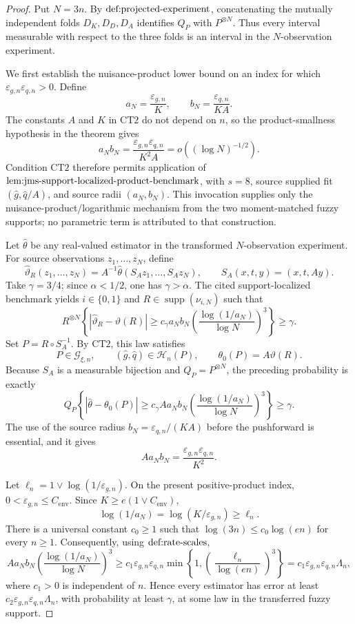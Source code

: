 \documentclass{article}
\begin{document}
\begin{proof}
Put \(N=3n\).  By \(\textup{def:projected-experiment}\), concatenating the mutually independent folds \(D_K,D_D,D_A\) identifies \(Q_P\) with \(P^{\otimes N}\).  Thus every interval measurable with respect to the three folds is an interval in the \(N\)-observation experiment.

We first establish the nuisance-product lower bound on an index for which \(\varepsilon_{g,n}\varepsilon_{q,n}>0\).  Define
\[
 a_N=\frac{\varepsilon_{g,n}}{K},
 \qquad
 b_N=\frac{\varepsilon_{q,n}}{KA}.
\]
The constants \(A\) and \(K\) in \(\mathrm{CT2}\) do not depend on \(n\), so the product-smallness hypothesis in the theorem gives
\[
 a_Nb_N
 =\frac{\varepsilon_{g,n}\varepsilon_{q,n}}{K^2A}
 =o\!\left((\log N)^{-1/2}\right).
\]
Condition \(\mathrm{CT2}\) therefore permits application of \(\textup{lem:jms-support-localized-product-benchmark}\), with \(s=8\), source supplied fit \((\widehat g,\widehat q/A)\), and source radii \((a_N,b_N)\).  This invocation supplies only the nuisance-product/logarithmic mechanism from the two moment-matched fuzzy supports; no parametric term is attributed to that construction.

Let \(\widehat\theta\) be any real-valued estimator in the transformed \(N\)-observation experiment.  For source observations \(z_1,\ldots,z_N\), define
\[
 \widehat\vartheta_R(z_1,\ldots,z_N)
 =A^{-1}\widehat\theta(S_Az_1,\ldots,S_Az_N),
 \qquad S_A(x,t,y)=(x,t,Ay).
\]
Take \(\gamma=3/4\); since \(\alpha<1/2\), one has \(\gamma>\alpha\).  The cited support-localized benchmark yields \(i\in\{0,1\}\) and \(R\in\operatorname{supp}(\nu_{i,N})\) such that
\[
 R^{\otimes N}\!\left\{
 \left|\widehat\vartheta_R-\vartheta(R)\right|
 \ge c_\gamma a_Nb_N
 \left(\frac{\log(1/a_N)}{\log N}\right)^3
 \right\}\ge\gamma .
\]
Set \(P=R\circ S_A^{-1}\).  By \(\mathrm{CT2}\), this law satisfies
\[
 P\in\mathcal G_{\xi,n},
 \qquad
 (\widehat g,\widehat q)\in\mathcal H_n(P),
 \qquad
 \theta_0(P)=A\vartheta(R).
\]
Because \(S_A\) is a measurable bijection and \(Q_P=P^{\otimes N}\), the preceding probability is exactly
\[
 Q_P\!\left\{
 \left|\widehat\theta-\theta_0(P)\right|
 \ge c_\gamma A a_Nb_N
 \left(\frac{\log(1/a_N)}{\log N}\right)^3
 \right\}\ge\gamma .
\]
The use of the source radius \(b_N=\varepsilon_{q,n}/(KA)\) before the pushforward is essential, and it gives
\[
 A a_Nb_N
 =\frac{\varepsilon_{g,n}\varepsilon_{q,n}}{K^2}.
\]

Let \(\ell_n=1\vee\log(1/\varepsilon_{g,n})\).  On the present positive-product index, \(0<\varepsilon_{g,n}\le C_{\mathrm{env}}\).  Since \(K\ge e(1\vee C_{\mathrm{env}})\),
\[
 \log(1/a_N)=\log(K/\varepsilon_{g,n})\ge\ell_n.
\]
There is a universal constant \(c_0\ge1\) such that \(\log(3n)\le c_0\log(en)\) for every \(n\ge1\).  Consequently, using \(\textup{def:rate-scales}\),
\[
 A a_Nb_N
 \left(\frac{\log(1/a_N)}{\log N}\right)^3
 \ge c_1\varepsilon_{g,n}\varepsilon_{q,n}
 \min\!\left\{1,
 \left(\frac{\ell_n}{\log(en)}\right)^3\right\}
 =c_1\varepsilon_{g,n}\varepsilon_{q,n}\Lambda_n,
\]
where \(c_1>0\) is independent of \(n\).  Hence every estimator has error at least \(c_2\varepsilon_{g,n}\varepsilon_{q,n}\Lambda_n\), with probability at least \(\gamma\), at some law in the transferred fuzzy support.


\end{proof}
\end{document}
